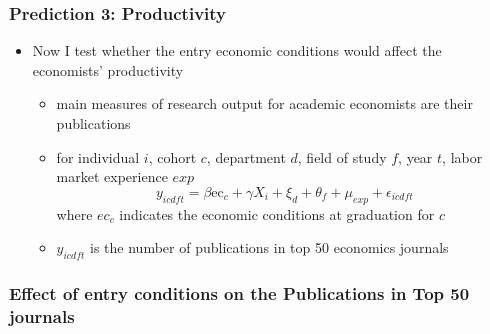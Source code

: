 \documentclass[11pt]{beamer}
\begin{document}
\begin{frame}
	\frametitle{Prediction 3: Productivity}
	\begin{itemize}
		\item Now I test whether the entry economic conditions would affect the economists' productivity
		\begin{itemize}
			\item main measures of research output for academic economists are their publications
			\item for individual $i$, cohort $c$,  department $d$, field of study $f$, year $t$, labor market experience $exp$
				\begin{equation*}
					y_{icdft} = \beta \text{ec}_{c}+\gamma X_{i}+\xi_{d}+\theta_f +\mu_{exp}  +\epsilon_{icdft}
				\end{equation*}
				where $ec_c$ indicates the economic conditions at graduation for $c$
				\item $y_{icdft}$ is the number of publications in top 50 economics journals 
			\end{itemize}
	\end{itemize}
\end{frame}

{
	\begin{frame}
		\frametitle{Effect of entry conditions on the Publications in Top 50 journals}
		
	\end{frame}
}
\end{document}
